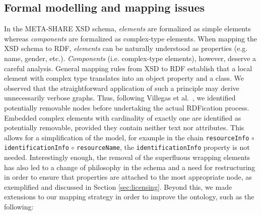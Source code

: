 \documentclass{llncs}
\begin{document}
\subsection{Formal modelling and mapping issues}
\label{sec:mapping}

In the META-SHARE XSD schema, \emph{elements} are formalized as simple elements
whereas \emph{components} are formalized as complex-type elements. When mapping
the XSD schema to RDF, \emph{elements} can be naturally understood as properties
(e.g. name, gender, etc.). \emph{Components} (i.e. complex-type elements),
however, deserve a careful analysis. General mapping rules from XSD to RDF
establish that a local element with complex type translates into an object
property and a class. We observed that the straightforward application of such a
principle may derive unnecessarily verbose graphs. Thus,
following Villegas et al.~\cite{Villegas2014}, we identified potentially removable nodes before
undertaking the actual RDFication process. Embedded complex elements with
cardinality of exactly one are identified as potentially removable, provided they contain
neither text nor attributes. This allows for a simplification of the model, for
example in the chain {\tt resourceInfo} $\circ$ {\tt identificationInfo}
$\circ$ {\tt resourceName}, the {\tt identificationInfo} property is not needed.
Interestingly enough, the removal of the superfluous wrapping elements has also
led to a change of philosophy in the schema and a need for restructuring in order to ensure that properties are attached to the most appropriate node, as exemplified and discussed in Section \ref{sec:licensing}.
Beyond this, we made extensions to our mapping strategy in order to improve the ontology, such as the following:
\end{document}
